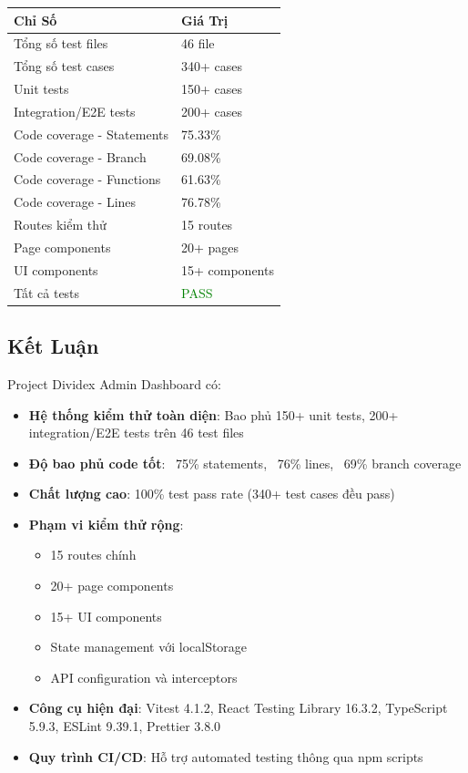 \documentclass[12pt,a4paper,vietnamese]{article}
\begin{document}
\begin{table}[h]
\centering
\begin{tabular}{|L{5cm}|C{4cm}|}
\hline
\textbf{Chỉ Số} & \textbf{Giá Trị} \\
\hline
Tổng số test files & 46 file \\
\hline
Tổng số test cases & 340+ cases \\
\hline
Unit tests & 150+ cases \\
\hline
Integration/E2E tests & 200+ cases \\
\hline
Code coverage - Statements & 75.33\% \\
\hline
Code coverage - Branch & 69.08\% \\
\hline
Code coverage - Functions & 61.63\% \\
\hline
Code coverage - Lines & 76.78\% \\
\hline
Routes kiểm thử & 15 routes \\
\hline
Page components & 20+ pages \\
\hline
UI components & 15+ components \\
\hline
Tất cả tests & \textcolor{green}{PASS} \\
\hline
\end{tabular}
\end{table}

\subsection{Kết Luận}

Project Dividex Admin Dashboard có:
\begin{itemize}
    \item \textbf{Hệ thống kiểm thử toàn diện}: Bao phủ 150+ unit tests, 200+ integration/E2E tests trên 46 test files
    \item \textbf{Độ bao phủ code tốt}: ~75\% statements, ~76\% lines, ~69\% branch coverage
    \item \textbf{Chất lượng cao}: 100\% test pass rate (340+ test cases đều pass)
    \item \textbf{Phạm vi kiểm thử rộng}:
    \begin{itemize}
        \item 15 routes chính
        \item 20+ page components
        \item 15+ UI components
        \item State management với localStorage
        \item API configuration và interceptors
    \end{itemize}
    \item \textbf{Công cụ hiện đại}: Vitest 4.1.2, React Testing Library 16.3.2, TypeScript 5.9.3, ESLint 9.39.1, Prettier 3.8.0
    \item \textbf{Quy trình CI/CD}: Hỗ trợ automated testing thông qua npm scripts
\end{itemize}
\end{document}
